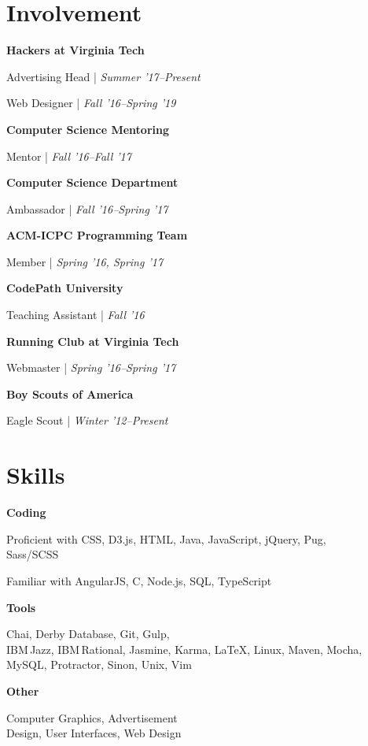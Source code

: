 \documentclass[9pt]{extarticle}
\newcommand{\Subsection}[2]{
    {\normalsize\bfseries\color{subsection}#1}
    \begin{trivlist}
        \color{bullet}
        #2
    \end{trivlist}
}
\newcommand{\ChronoItem}[2]{
    \item {\color{bullet}#1 | {\footnotesize\textit{#2}}}
}
\begin{document}
\begin{paracol}{2}
\begin{rightcolumn}
        \section{Involvement}
            \Subsection{Hackers at Virginia Tech}{
                \ChronoItem{Advertising Head}{Summer '17--Present}
                \ChronoItem{Web Designer}{Fall '16--Spring '19}
            }
            \vfill
            \Subsection{Computer Science Mentoring}{
                \ChronoItem{Mentor}{Fall '16--Fall '17}
            }
            \vfill
            \Subsection{Computer Science Department}{
                \ChronoItem{Ambassador}{Fall '16--Spring '17}
            }
            \vfill
            \Subsection{ACM-ICPC Programming Team}{
                \ChronoItem{Member}{Spring '16, Spring '17}
            }
            \vfill
            \Subsection{CodePath University}{
                \ChronoItem{Teaching Assistant}{Fall '16}
            }
            \vfill
            \Subsection{Running Club at Virginia Tech}{
                \ChronoItem{Webmaster}{Spring '16--Spring '17}
            }
            \vfill
            \Subsection{Boy Scouts of America}{
                \ChronoItem{Eagle Scout}{Winter '12--Present}
            }
        \vfill
        \section{Skills}
            \Subsection{Coding}{
                \item Proficient with CSS, D3.js, HTML, Java, JavaScript, jQuery, Pug,\\Sass/SCSS
                \item Familiar with AngularJS, C, Node.js, SQL, TypeScript
            }
            \vfill
            \Subsection{Tools}{
                \item Chai, Derby Database, Git, Gulp,\\IBM\,Jazz, IBM\,Rational, Jasmine, Karma, LaTeX, Linux, Maven, Mocha, MySQL, Protractor, Sinon, Unix, Vim
            }
            \vfill
            \Subsection{Other}{
                \item Computer Graphics, Advertisement\\Design, User Interfaces, Web Design
            }
        \pagebreak
    \end{rightcolumn}
\end{paracol}
\end{document}
